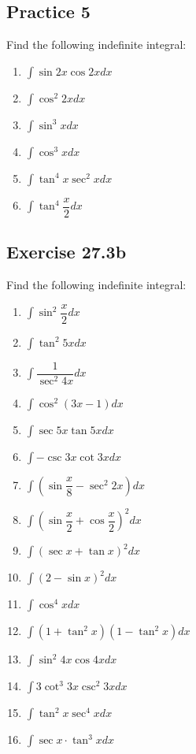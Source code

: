 \documentclass{report}
\begin{document}
\subsection{Practice 5}
Find the following indefinite integral:
\begin{enumerate}
    \item $\displaystyle\int\sin2x\cos2x dx$
    \item $\displaystyle\int\cos^2 2x dx$
    \item $\displaystyle\int\sin^3 x dx$
    \item $\displaystyle\int\cos^3 x dx$
    \item $\displaystyle\int\tan^4 x\sec^2 x dx$
    \item $\displaystyle\int\tan^4\dfrac{x}{2} dx$
\end{enumerate}

\subsection{Exercise 27.3b}
Find the following indefinite integral:
\begin{enumerate}
    \item $\displaystyle\int\sin^2\dfrac{x}{2} dx$
    \item $\displaystyle\int\tan^2 5x dx$
    \item $\displaystyle\int\dfrac{1}{\sec^2 4x} dx$
    \item $\displaystyle\int\cos^2(3x - 1) dx$
    \item $\displaystyle\int\sec5x\tan5x dx$
    \item $\displaystyle\int-\csc3x\cot3x dx$
    \item $\displaystyle\int\left(\sin\dfrac{x}{8} - \sec^2 2x\right) dx$
    \item $\displaystyle\int\left(\sin{\dfrac{x}{2}}+\cos{\dfrac{x}{2}}\right)^{2} dx$
    \item $\displaystyle\int(\sec x+\tan x)^{2} dx$
    \item $\displaystyle\int(2-\sin x)^{2} dx$
    \item $\displaystyle\int\cos^4 x dx$
    \item $\displaystyle\int\left(1+\tan^{2}x\right)\left(1-\tan^{2}x\right) dx$
    \item $\displaystyle\int\sin^{2}4x\cos4x dx$
    \item $\displaystyle\int3\cot^{3}3x\csc^{2}3x dx$
    \item $\displaystyle\int\tan^{2}x\sec^{4}x dx$
    \item $\displaystyle\int\sec x\cdot\tan^{3}x dx$
\end{enumerate}
\end{document}
